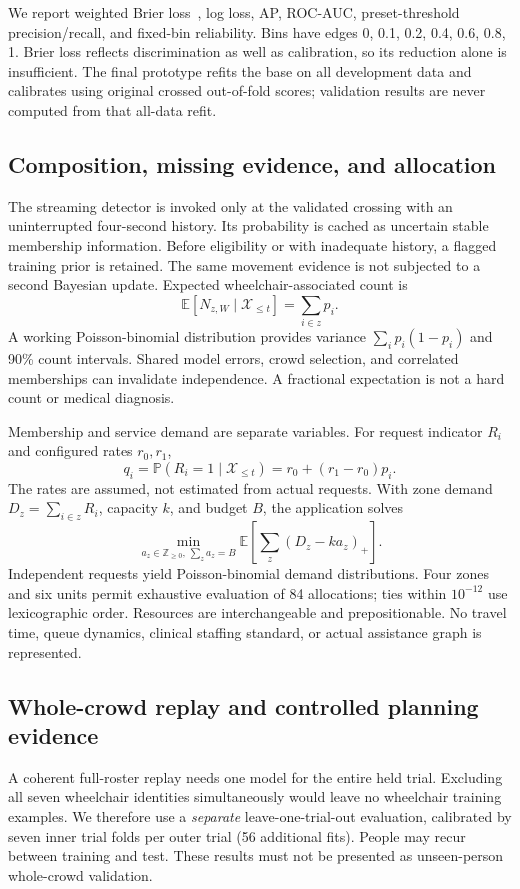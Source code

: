 \documentclass[conference]{IEEEtran}
\newcommand{\E}{\mathbb{E}}
\newcommand{\Prob}{\mathbb{P}}
\begin{document}
We report weighted Brier loss~\cite{brier}, log loss, AP, ROC-AUC, preset-threshold precision/recall, and fixed-bin reliability. Bins have edges 0, 0.1, 0.2, 0.4, 0.6, 0.8, 1. Brier loss reflects discrimination as well as calibration, so its reduction alone is insufficient. The final prototype refits the base on all development data and calibrates using original crossed out-of-fold scores; validation results are never computed from that all-data refit.

\subsection{Composition, missing evidence, and allocation}
The streaming detector is invoked only at the validated crossing with an uninterrupted four-second history. Its probability is cached as uncertain stable membership information. Before eligibility or with inadequate history, a flagged training prior is retained. The same movement evidence is not subjected to a second Bayesian update. Expected wheelchair-associated count is
\begin{equation}
\E[N_{z,W}\mid\mathcal{X}_{\leq t}]=\sum_{i\in z}p_i.
\end{equation}
A working Poisson-binomial distribution provides variance $\sum_i p_i(1-p_i)$ and 90\% count intervals. Shared model errors, crowd selection, and correlated memberships can invalidate independence. A fractional expectation is not a hard count or medical diagnosis.

Membership and service demand are separate variables. For request indicator $R_i$ and configured rates $r_0,r_1$,
\begin{equation}
q_i=\Prob(R_i=1\mid\mathcal{X}_{\leq t})=r_0+(r_1-r_0)p_i.
\end{equation}
The rates are assumed, not estimated from actual requests. With zone demand $D_z=\sum_{i\in z}R_i$, capacity $k$, and budget $B$, the application solves
\begin{equation}
\min_{a_z\in\mathbb{Z}_{\geq0},\,\sum_z a_z=B}
\E\!\left[\sum_z(D_z-ka_z)_+\right].
\end{equation}
Independent requests yield Poisson-binomial demand distributions. Four zones and six units permit exhaustive evaluation of 84 allocations; ties within $10^{-12}$ use lexicographic order. Resources are interchangeable and prepositionable. No travel time, queue dynamics, clinical staffing standard, or actual assistance graph is represented.

\subsection{Whole-crowd replay and controlled planning evidence}
A coherent full-roster replay needs one model for the entire held trial. Excluding all seven wheelchair identities simultaneously would leave no wheelchair training examples. We therefore use a \emph{separate} leave-one-trial-out evaluation, calibrated by seven inner trial folds per outer trial (56 additional fits). People may recur between training and test. These results must not be presented as unseen-person whole-crowd validation.
\end{document}
